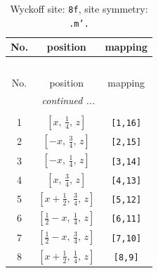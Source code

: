 \documentclass[fleqn,8pt]{jsarticle}
\begin{document}
\begin{longtable}{ccc}
\caption{Wyckoff site: {\tt 8f}, site symmetry: {\tt .m'.}}
 \\
 \hline \hline
No. & position & mapping \\ \hline \endfirsthead

\multicolumn{2}{l}{\tablename\ \thetable{}} \\
 \hline \hline
No. & position & mapping \\ \hline \endhead

 \hline \hline
\multicolumn{2}{r}{\footnotesize\it continued ...} \\ \endfoot

 \hline \hline
\multicolumn{2}{r}{} \\ \endlastfoot

1 & $\left[ x,\, \frac{1}{4},\, z \right]$ & {\tt [1,16]} \\ \hline
2 & $\left[ - x,\, \frac{3}{4},\, z \right]$ & {\tt [2,15]} \\ \hline
3 & $\left[ - x,\, \frac{1}{4},\, z \right]$ & {\tt [3,14]} \\ \hline
4 & $\left[ x,\, \frac{3}{4},\, z \right]$ & {\tt [4,13]} \\ \hline
5 & $\left[ x + \frac{1}{2},\, \frac{3}{4},\, z \right]$ & {\tt [5,12]} \\ \hline
6 & $\left[ \frac{1}{2} - x,\, \frac{1}{4},\, z \right]$ & {\tt [6,11]} \\ \hline
7 & $\left[ \frac{1}{2} - x,\, \frac{3}{4},\, z \right]$ & {\tt [7,10]} \\ \hline
8 & $\left[ x + \frac{1}{2},\, \frac{1}{4},\, z \right]$ & {\tt [8,9]} \\
\end{longtable}
\renewcommand{\arraystretch}{1.2}
\end{document}
